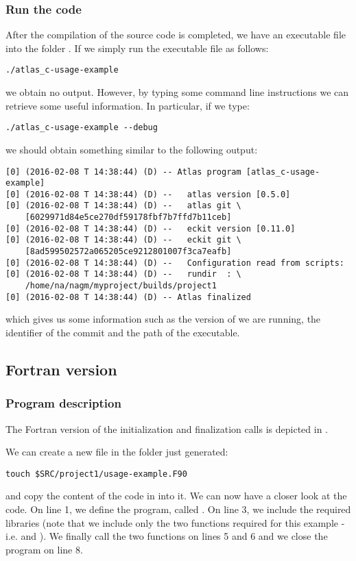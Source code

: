 \subsubsection*{Run the code}
After the compilation of the source code is completed, 
we have an executable file into the folder .
If we simply run the executable file as follows:
%
\begin{lstlisting}[style=BashStyle]
./atlas_c-usage-example
\end{lstlisting}
% 
we obtain no output. However, by typing some command 
line instructions we can retrieve some useful information. 
In particular, if we type:
%
\begin{lstlisting}[style=BashStyle]
./atlas_c-usage-example --debug
\end{lstlisting}
%
we should obtain something similar to the following output:
%
\begin{lstlisting}[style=BashStyle]
[0] (2016-02-08 T 14:38:44) (D) -- Atlas program [atlas_c-usage-example]
[0] (2016-02-08 T 14:38:44) (D) --   atlas version [0.5.0]
[0] (2016-02-08 T 14:38:44) (D) --   atlas git \
    [6029971d84e5ce270df59178fbf7b7ffd7b11ceb]
[0] (2016-02-08 T 14:38:44) (D) --   eckit version [0.11.0]
[0] (2016-02-08 T 14:38:44) (D) --   eckit git \
    [8ad599502572a065205ce9212801007f3ca7eafb]
[0] (2016-02-08 T 14:38:44) (D) --   Configuration read from scripts:
[0] (2016-02-08 T 14:38:44) (D) --   rundir  : \ 
    /home/na/nagm/myproject/builds/project1
[0] (2016-02-08 T 14:38:44) (D) -- Atlas finalized
\end{lstlisting}
%
which gives us some information such as the version of \Atlas we are 
running, the identifier of the commit and the path of the executable. 



\subsection{Fortran version}
\label{s:atlas-usage-example-F}

\subsubsection*{Program description}
The Fortran version of the \Atlas initialization and finalization 
calls is depicted in .
%

%
We can create a new file in the folder  just generated:
%
\begin{lstlisting}[style=BashStyle]
touch $SRC/project1/usage-example.F90
\end{lstlisting}
%
and copy the content of the code in  into it.
We can now have a closer look at the code.
On line 1, we define the program, called .
On line 3, we include the required \Atlas libraries
(note that we include only the two functions required 
for this example - i.e. \inltf{atlas\_init} and ).
We finally call the two functions  
on lines 5 and 6 and we close the program on line 8.

